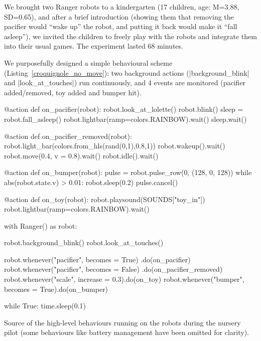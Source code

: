 \documentclass[a4paper, 10pt, conference]{ieeeconf}      %
\begin{document}
We brought two Ranger robots to a kindergarten (17 children, age: M=3.88,
SD=0.65), and after a brief introduction (showing them that removing the
pacifier would ``wake up'' the robot, and putting it back would make it ``fall
asleep''), we invited the children to freely play with the robots and integrate
them into their usual games. The experiment lasted 68 minutes.

We purposefully designed a simple behavioural scheme
(Listing~\ref{croquignole_no_move}): two background actions
(\python|background_blink| and \python|look_at_touches|) run continuously, and 4
events are monitored (pacifier added/removed, toy added and bumper hit).

\begin{listing}[h!]

\begin{pythoncode}
    @action
    def on_pacifier(robot):
        robot.look_at_lolette()
        robot.blink()
        sleep = robot.fall_asleep()
        robot.lightbar(ramp=colors.RAINBOW).wait()
        sleep.wait()
    
    @action
    def on_pacifier_removed(robot):
        robot.light_bar(colors.from_hls(rand(0,1),0.8,1))
        robot.wakeup().wait()
        robot.move(0.4, v = 0.8).wait()
        robot.idle().wait()
    
    @action
    def on_bumper(robot):
        pulse = robot.pulse_row(0, (128, 0, 128))
        while abs(robot.state.v) > 0.01:
            robot.sleep(0.2)
        pulse.cancel()
    
    @action
    def on_toy(robot):
        robot.playsound(SOUNDS["toy_in"])
        robot.lightbar(ramp=colors.RAINBOW).wait()
    
    with Ranger() as robot:
    
        robot.background_blink()
        robot.look_at_touches()
    
        robot.whenever("pacifier", becomes = True)
                                    .do(on_pacifier)
        robot.whenever("pacifier", becomes = False)
                                    .do(on_pacifier_removed)
        robot.whenever("scale", increase = 0.3).do(on_toy)
        robot.whenever("bumper", becomes = True).do(on_bumper)
    
        while True:
            time.sleep(0.1)
\end{pythoncode}
\caption{Source of the high-level behaviours running on the robots during the
nursery pilot (some behaviours like battery management have been omitted for
clarity).}
\label{croquignole_no_move}
\end{listing}
\end{document}
